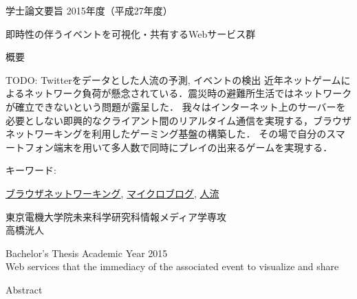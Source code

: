 \newpage
\pagestyle{plain}
\begin{center}
\LARGE{学士論文要旨 \hspace{10mm} 2015年度（平成27年度）}\\

\vspace{10mm}

\LARGE{即時性の伴うイベントを可視化・共有するWebサービス群}\\
\end{center}

\begin{center}
概要\\
\end{center}

TODO: Twitterをデータとした人流の予測, イベントの検出
 近年ネットゲームによるネットワーク負荷が懸念されている．震災時の避難所生活ではネットワークが確立できないという問題が露呈した．
我々はインターネット上のサーバーを必要としない即興的なクライアント間のリアルタイム通信を実現する，ブラウザネットワーキングを利用したゲーミング基盤の構築した．
 その場で自分のスマートフォン端末を用いて多人数で同時にプレイの出来るゲームを実現する．

\begin{flushleft}キーワード:\\
\end{flushleft}
{\underline{ブラウザネットワーキング}, \underline{マイクロブログ}, \underline{人流}}


\begin{center}
\vspace{10mm}
\begin{flushright}\large 東京電機大学院未来科学研究科情報メディア学専攻\\
\LARGE 高橋洸人\\
\end{flushright}
\end{center}

\newpage

\begin{center}
\LARGE{Bachelor's Thesis Academic Year 2015}\\

\vspace{10mm}
\LARGE{Web services that the immediacy of the associated event to visualize and share}\\
\end{center}
\begin{center}
Abstract\\
\end{center}

